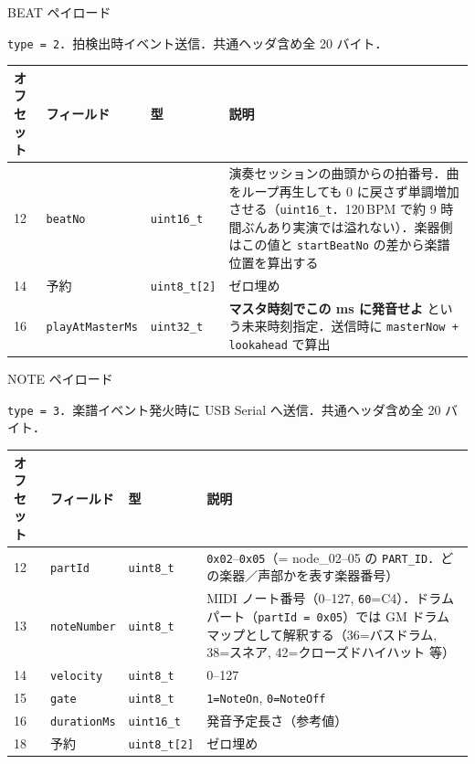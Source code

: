 \documentclass[lualatex,book,paper=a4paper,jafontsize=11.5pt,jafontscale=1.05]{jlreq}
\begin{document}
\begin{apibox}{BEAT ペイロード}
{\raggedright \texttt{type = 2}．拍検出時イベント送信．共通ヘッダ含め全 20 バイト．\par}\medskip
\begin{tabular}{l l l p{}}
\textbf{オフセット} & \textbf{フィールド} & \textbf{型} & \textbf{説明} \\
\midrule
12 & \texttt{beatNo}         & \texttt{uint16\_t}   & 演奏セッションの曲頭からの拍番号．曲をループ再生しても 0 に戻さず単調増加させる（\texttt{uint16\_t}．120\,BPM で約 9 時間ぶんあり実演では溢れない）．楽器側はこの値と \texttt{startBeatNo} の差から楽譜位置を算出する \\
14 & 予約                     & \texttt{uint8\_t[2]} & ゼロ埋め \\
16 & \texttt{playAtMasterMs} & \texttt{uint32\_t}   & \textbf{マスタ時刻でこの ms に発音せよ} という未来時刻指定．送信時に \texttt{masterNow + lookahead} で算出 \\
\end{tabular}
\end{apibox}

\begin{apibox}{NOTE ペイロード}
{\raggedright \texttt{type = 3}．楽譜イベント発火時に USB Serial へ送信．共通ヘッダ含め全 20 バイト．\par}\medskip
\begin{tabular}{l l l p{}}
\textbf{オフセット} & \textbf{フィールド} & \textbf{型} & \textbf{説明} \\
\midrule
12 & \texttt{partId}      & \texttt{uint8\_t}    & \texttt{0x02}--\texttt{0x05}（= node\_02--05 の \texttt{PART\_ID}．どの楽器／声部かを表す楽器番号） \\
13 & \texttt{noteNumber}  & \texttt{uint8\_t}    & MIDI ノート番号（0--127, \texttt{60}=C4）．ドラムパート（\texttt{partId = 0x05}）では GM ドラムマップとして解釈する（36=バスドラム, 38=スネア, 42=クローズドハイハット 等） \\
14 & \texttt{velocity}    & \texttt{uint8\_t}    & 0--127 \\
15 & \texttt{gate}        & \texttt{uint8\_t}    & \texttt{1=NoteOn}, \texttt{0=NoteOff} \\
16 & \texttt{durationMs}  & \texttt{uint16\_t}   & 発音予定長さ（参考値） \\
18 & 予約                  & \texttt{uint8\_t[2]} & ゼロ埋め \\
\end{tabular}
\end{apibox}
\end{document}
